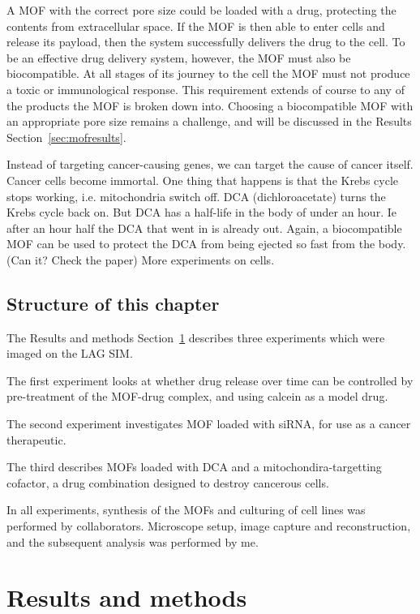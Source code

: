 A MOF with the correct pore size could be loaded with a drug, protecting the contents from extracellular space. 
If the MOF is then able to enter cells and release its payload, then the system successfully delivers the drug to the cell. 
To be an effective drug delivery system, however, the MOF must also be biocompatible.
At all stages of its journey to the cell the MOF must not produce a toxic or immunological response. 
This requirement extends of course to any of the products the MOF is broken down into. 
Choosing a biocompatible MOF with an appropriate pore size remains a challenge, and will be discussed in the Results Section~\ref{sec:mofresults}. 

Instead of targeting cancer-causing genes, we can target the cause of cancer itself. 
Cancer cells become immortal. 
One thing that happens is that the Krebs cycle stops working, i.e. mitochondria switch off.
DCA (dichloroacetate) turns the Krebs cycle back on.
But DCA has a half-life in the body of under an hour. Ie after an hour half the DCA that went in is already out. 
Again, a biocompatible MOF can be used to protect the DCA from being ejected so fast from the body. (Can it? Check the paper)
More experiments on cells. 


\subsection{Structure of this chapter}
The Results and methods Section~\ref{sec:mofmethods} describes three experiments which were imaged on the LAG SIM. 

The first experiment looks at whether drug release over time can be controlled by pre-treatment of the MOF-drug complex, and using calcein as a model drug. 

The second experiment investigates MOF loaded with siRNA, for use as a cancer therapeutic.
 
The third describes MOFs loaded with DCA and a mitochondira-targetting cofactor, a drug combination designed to destroy cancerous cells. 

In all experiments, synthesis of the MOFs and culturing of cell lines was performed by collaborators. 
Microscope setup, image capture and reconstruction, and the subsequent analysis was performed by me. 

\section{Results and methods} \label{sec:mofmethods}

